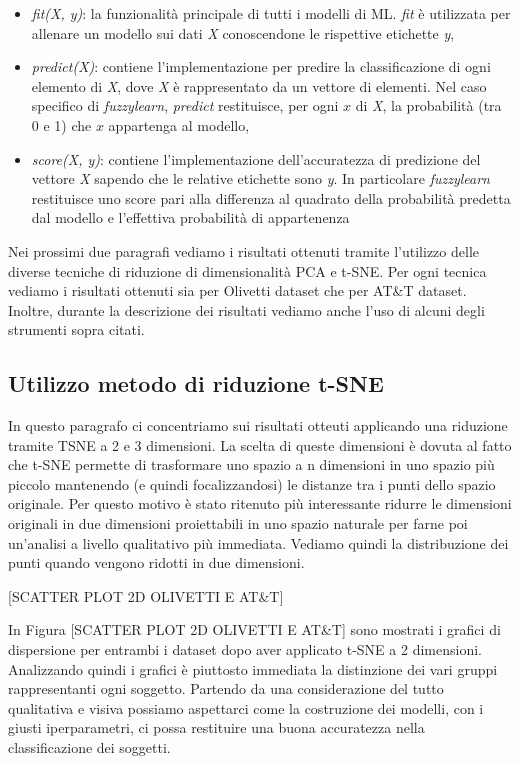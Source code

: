 \documentclass[12pt,italian]{report}
\begin{document}
\begin{itemize}
\item{\emph{fit(X, y)}: la funzionalità principale di tutti i modelli di ML. \emph{fit} è utilizzata per allenare un modello sui dati \emph{X} conoscendone le rispettive etichette \emph{y},}
\item{\emph{predict(X)}: contiene l'implementazione per predire la classificazione di ogni elemento di \emph{X}, dove \emph{X} è rappresentato da un vettore di elementi. Nel caso specifico di \emph{fuzzylearn}, \emph{predict} restituisce, per ogni $x$ di \emph{X}, la probabilità (tra 0 e 1) che $x$ appartenga al modello,}
\item{\emph{score(X, y)}: contiene l'implementazione dell'accuratezza di predizione del vettore \emph{X} sapendo che le relative etichette sono \emph{y}. In particolare \emph{fuzzylearn} restituisce uno score pari alla differenza al quadrato della probabilità predetta dal modello e l'effettiva probabilità di appartenenza}
\end{itemize}
Nei prossimi due paragrafi vediamo i risultati ottenuti tramite l'utilizzo delle diverse tecniche di riduzione di dimensionalità PCA e t-SNE. Per ogni tecnica vediamo i risultati ottenuti sia per Olivetti dataset che per AT\&T dataset. Inoltre, durante la descrizione dei risultati vediamo anche l'uso di alcuni degli strumenti sopra citati.

\subsection{Utilizzo metodo di riduzione t-SNE}
In questo paragrafo ci concentriamo sui risultati otteuti applicando una riduzione tramite TSNE a 2 e 3 dimensioni. La scelta di queste dimensioni è dovuta al fatto che t-SNE permette di trasformare uno spazio a n dimensioni in uno spazio più piccolo mantenendo (e quindi focalizzandosi) le distanze tra i punti dello spazio originale. Per questo motivo è stato ritenuto più interessante ridurre le dimensioni originali in due dimensioni proiettabili in uno spazio naturale per farne poi un'analisi a livello qualitativo più immediata. Vediamo quindi la distribuzione dei punti quando vengono ridotti in due dimensioni.

[SCATTER PLOT 2D OLIVETTI E AT\&T]

In Figura [SCATTER PLOT 2D OLIVETTI E AT\&T] sono mostrati i grafici di dispersione per entrambi i dataset dopo aver applicato t-SNE a 2 dimensioni. Analizzando quindi i grafici è piuttosto immediata la distinzione dei vari gruppi rappresentanti ogni soggetto. Partendo da una considerazione del tutto qualitativa e visiva possiamo aspettarci come la costruzione dei modelli, con i giusti iperparametri, ci possa restituire una buona accuratezza nella classificazione dei soggetti.
\end{document}
